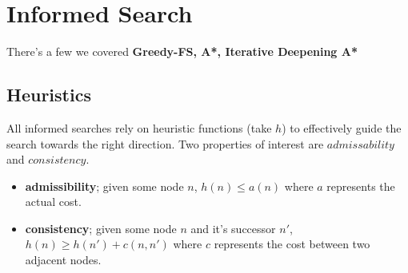 \documentclass{article}
\begin{document}
\section{Informed Search}
There's a few we covered \textbf{Greedy-FS, A*, Iterative Deepening A*}

\subsection{Heuristics}
All informed searches rely on heuristic functions (take $h$) to effectively guide the search towards the right direction. Two properties of interest are $admissability$ and $consistency$.

\begin{itemize}
	\item \textbf{admissibility}; given some node $n$, $h(n) \leq a(n)$ where $a$ represents the actual cost.
	\item \textbf{consistency}; given some node $n$ and it's successor $n'$, $h(n) \geq h(n') + c(n, n')$ where $c$ represents the cost between two adjacent nodes.
\end{itemize}
\end{document}
